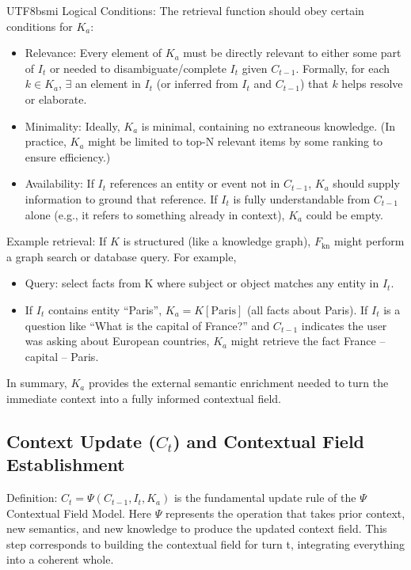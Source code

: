 \documentclass{article}
\begin{document}
\begin{CJK*}{UTF8}{bsmi}
Logical Conditions: The retrieval function should obey certain conditions for $K_a$:
\begin{itemize}[label=●]
    \item Relevance: Every element of $K_a$ must be directly relevant to either some part of $I_t$ or needed to disambiguate/complete $I_t$ given $C_{t-1}$. Formally, for each $k \in K_a$, $\exists$ an element in $I_t$ (or inferred from $I_t$ and $C_{t-1}$) that $k$ helps resolve or elaborate.
    \item Minimality: Ideally, $K_a$ is minimal, containing no extraneous knowledge. (In practice, $K_a$ might be limited to top-N relevant items by some ranking to ensure efficiency.)
    \item Availability: If $I_t$ references an entity or event not in $C_{t-1}$, $K_a$ should supply information to ground that reference. If $I_t$ is fully understandable from $C_{t-1}$ alone (e.g., it refers to something already in context), $K_a$ could be empty.
\end{itemize}

Example retrieval: If $K$ is structured (like a knowledge graph), $F_{\text{kn}}$ might perform a graph search or database query. For example,
\begin{itemize}[label=●]
    \item Query: select facts from K where subject or object matches any entity in $I_t$.
    \item If $I_t$ contains entity “Paris”, $K_a = K[\text{Paris}]$ (all facts about Paris). If $I_t$ is a question like “What is the capital of France?” and $C_{t-1}$ indicates the user was asking about European countries, $K_a$ might retrieve the fact France – capital – Paris.
\end{itemize}
In summary, $K_a$ provides the external semantic enrichment needed to turn the immediate context into a fully informed contextual field.

\subsection{Context Update ($C_t$) and Contextual Field Establishment}
Definition: $C_t = \Psi(C_{t-1}, I_t, K_a)$ is the fundamental update rule of the $\Psi$ Contextual Field Model. Here $\Psi$ represents the operation that takes prior context, new semantics, and new knowledge to produce the updated context field. This step corresponds to building the contextual field for turn t, integrating everything into a coherent whole.


\end{CJK*}
\end{document}
